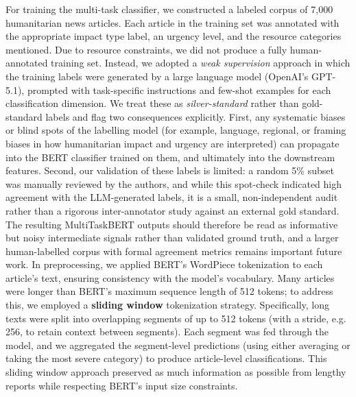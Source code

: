 \documentclass{article}
\begin{document}
For training the multi-task classifier, we constructed a labeled corpus of 7{,}000 humanitarian news articles. Each article in the training set was annotated with the appropriate impact type label, an urgency level, and the resource categories mentioned. Due to resource constraints, we did not produce a fully human-annotated training set. Instead, we adopted a \textit{weak supervision} approach in which the training labels were generated by a large language model (OpenAI's GPT-5.1), prompted with task-specific instructions and few-shot examples for each classification dimension. We treat these as \textit{silver-standard} rather than gold-standard labels and flag two consequences explicitly. First, any systematic biases or blind spots of the labelling model (for example, language, regional, or framing biases in how humanitarian impact and urgency are interpreted) can propagate into the BERT classifier trained on them, and ultimately into the downstream features. Second, our validation of these labels is limited: a random 5\% subset was manually reviewed by the authors, and while this spot-check indicated high agreement with the LLM-generated labels, it is a small, non-independent audit rather than a rigorous inter-annotator study against an external gold standard. The resulting MultiTaskBERT outputs should therefore be read as informative but noisy intermediate signals rather than validated ground truth, and a larger human-labelled corpus with formal agreement metrics remains important future work. In preprocessing, we applied BERT’s WordPiece tokenization to each article’s text, ensuring consistency with the model’s vocabulary. Many articles were longer than BERT’s maximum sequence length of 512 tokens; to address this, we employed a \textbf{sliding window} tokenization strategy. Specifically, long texts were split into overlapping segments of up to 512 tokens (with a stride, e.g. 256, to retain context between segments). Each segment was fed through the model, and we aggregated the segment-level predictions (using either averaging or taking the most severe category) to produce article-level classifications. This sliding window approach preserved as much information as possible from lengthy reports while respecting BERT’s input size constraints.\\
\end{document}
